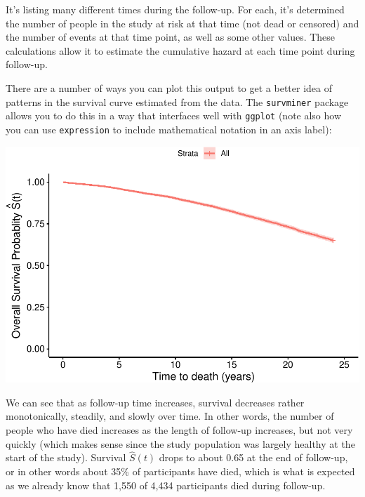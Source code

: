 \documentclass[
]{book}
\newenvironment{Shaded}{\begin{snugshade}}{\end{snugshade}}
\newcommand{\CommentTok}[1]{\textcolor[rgb]{0.56,0.35,0.01}{\textit{#1}}}
\newcommand{\DataTypeTok}[1]{\textcolor[rgb]{0.13,0.29,0.53}{#1}}
\newcommand{\KeywordTok}[1]{\textcolor[rgb]{0.13,0.29,0.53}{\textbf{#1}}}
\newcommand{\NormalTok}[1]{#1}
\newcommand{\OperatorTok}[1]{\textcolor[rgb]{0.81,0.36,0.00}{\textbf{#1}}}
\newcommand{\StringTok}[1]{\textcolor[rgb]{0.31,0.60,0.02}{#1}}
\begin{document}
It's listing many different times during the follow-up. For each, it's determined the number of people in the study at risk at that time (not dead or censored) and the number of events at that time point, as well as some other values. These calculations allow it to estimate the cumulative hazard at each time point during follow-up.

There are a number of ways you can plot this output to get a better idea of patterns in the survival curve estimated from the data. The \texttt{survminer} package allows you to do this in a way that interfaces well with \texttt{ggplot} (note also how you can use \texttt{expression} to include mathematical notation in an axis label):

\begin{Shaded}
\end{Shaded}

\includegraphics{adv_epi_analysis_files/figure-latex/unnamed-chunk-201-1.pdf}

We can see that as follow-up time increases, survival decreases rather monotonically, steadily, and slowly over time. In other words, the number of people who have died increases as the length of follow-up increases, but not very quickly (which makes sense since the study population was largely healthy at the start of the study). Survival \(\hat{S}(t)\) drops to about 0.65 at the end of follow-up, or in other words about 35\% of participants have died, which is what is expected as we already know that 1,550 of 4,434 participants died during follow-up.
\end{document}
